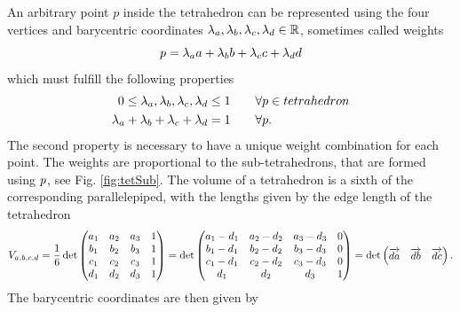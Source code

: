 An  arbitrary point $p$ inside the tetrahedron can be represented using the four vertices and barycentric coordinates $\lambda_a, \lambda_b, \lambda_c, \lambda_d \in \mathbb{R}$, sometimes called weights
\begin{equation*}
    p = \lambda_a a + \lambda_b b + \lambda_c c + \lambda_d d
\end{equation*}
which must fulfill the following properties
\begin{align*}
    0 \leq \lambda_a, \lambda_b, \lambda_c, \lambda_d \leq 1  \qquad &\forall p \in tetrahedron \\
    \lambda_a + \lambda_b + \lambda_c + \lambda_d = 1 \qquad &\forall p.
\end{align*}
The second property is necessary to have a unique weight combination for each point.
The weights are proportional to the sub-tetrahedrons, that are formed using $p$, see Fig. \ref{fig:tetSub}.
The volume of a tetrahedron is a sixth of the corresponding parallelepiped, with the lengths given by the edge length of the tetrahedron
\begin{equation}
    V_{a, b, c, d} = \dfrac{1}{6}\operatorname{det} \begin{pmatrix}
        a_1 & a_2 & a_3 & 1 \\
        b_1 & b_2 & b_3 & 1 \\
        c_1 & c_2 & c_3 & 1 \\
        d_1 & d_2 & d_3 & 1        
    \end{pmatrix} = \operatorname{det} \begin{pmatrix}
        a_1 - d_1& a_2 - d_2& a_3 - d_3& 0 \\
        b_1 - d_1& b_2 - d_2& b_3 - d_3& 0 \\
        c_1 - d_1& c_2 - d_2& c_3 - d_3& 0 \\
        d_1 & d_2 & d_3 & 1  
    \end{pmatrix}= \operatorname{det} \begin{pmatrix}
     \overrightarrow{d a} & \overrightarrow{d b} & \overrightarrow{d c}  
    \end{pmatrix}.
\end{equation}
The barycentric coordinates are then given by
